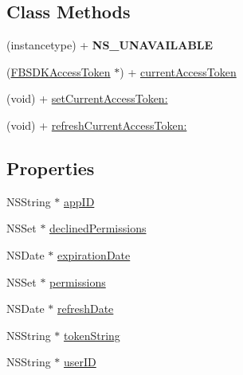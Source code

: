 \subsection*{Class Methods}
\begin{DoxyCompactItemize}
\item 
\hypertarget{interface_f_b_s_d_k_access_token_a73cc57476f065e08ede78124c5ed1ef1}{}(instancetype) + {\bfseries N\+S\+\_\+\+U\+N\+A\+V\+A\+I\+L\+A\+B\+L\+E}\label{interface_f_b_s_d_k_access_token_a73cc57476f065e08ede78124c5ed1ef1}

\item 
(\hyperlink{interface_f_b_s_d_k_access_token}{F\+B\+S\+D\+K\+Access\+Token} $\ast$) + \hyperlink{interface_f_b_s_d_k_access_token_a245bde98fb3133bce397d2934b420da8}{current\+Access\+Token}
\item 
(void) + \hyperlink{interface_f_b_s_d_k_access_token_a001ba021b6297da1a52c1c0e0b089ef2}{set\+Current\+Access\+Token\+:}
\item 
(void) + \hyperlink{interface_f_b_s_d_k_access_token_aec2f48a718581096649c2ca88d16f1ac}{refresh\+Current\+Access\+Token\+:}
\end{DoxyCompactItemize}
\subsection*{Properties}
\begin{DoxyCompactItemize}
\item 
N\+S\+String $\ast$ \hyperlink{interface_f_b_s_d_k_access_token_a421ecb43a439e88824ec8053b39d34c6}{app\+I\+D}
\item 
N\+S\+Set $\ast$ \hyperlink{interface_f_b_s_d_k_access_token_ab4956044ecf71be910f37f3309431d9d}{declined\+Permissions}
\item 
N\+S\+Date $\ast$ \hyperlink{interface_f_b_s_d_k_access_token_aea6bd2db9834ca1610f2ed47a3e28c2f}{expiration\+Date}
\item 
N\+S\+Set $\ast$ \hyperlink{interface_f_b_s_d_k_access_token_a2149ed50b338301f93c4ff43915076d3}{permissions}
\item 
N\+S\+Date $\ast$ \hyperlink{interface_f_b_s_d_k_access_token_a97b06b3694130f8d29761fe98e19e94f}{refresh\+Date}
\item 
N\+S\+String $\ast$ \hyperlink{interface_f_b_s_d_k_access_token_a03b123d10be809c697973673cd805b22}{token\+String}
\item 
N\+S\+String $\ast$ \hyperlink{interface_f_b_s_d_k_access_token_ab8217b11468a826310a27ffe1e79ac7e}{user\+I\+D}
\end{DoxyCompactItemize}


